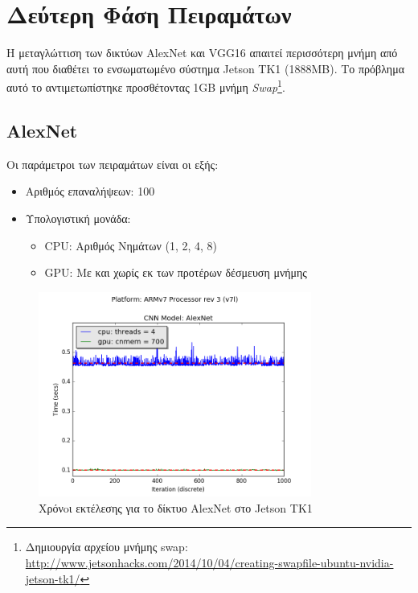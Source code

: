 \section{Δεύτερη Φάση Πειραμάτων}
\label{sec:experiments_phase2}

Η μεταγλώττιση των δικτύων AlexNet και VGG16 απαιτεί περισσότερη
μνήμη από αυτή που διαθέτει το ενσωματωμένο σύστημα Jetson TK1 (1888MB).
Το πρόβλημα αυτό το αντιμετωπίστηκε προσθέτοντας 1GB μνήμη
\emph{Swap}\footnote{Δημιουργία αρχείου μνήμης swap: \url{http://www.jetsonhacks.com/2014/10/04/creating-swapfile-ubuntu-nvidia-jetson-tk1/}}.


\subsection{AlexNet}

Οι παράμετροι των πειραμάτων είναι οι εξής:
\begin{itemize}
  \item{Αριθμός επαναλήψεων: 100}
  \item{Υπολογιστική μονάδα:}
    \begin{itemize}
      \item{CPU: Αριθμός Νημάτων (1, 2, 4, 8)}
      \item{GPU: Με και χωρίς εκ των προτέρων δέσμευση μνήμης}
    \end{itemize}
\end{itemize}

\begin{figure}[H]
  \centering
  \includegraphics[width=0.8\textwidth]{./images/chapter6/benchmark_alexnet_jetson.png}
  \caption[Χρόνoι εκτέλεσης για το δίκτυο AlexNet στο Jetson TK1]{Χρόνoι εκτέλεσης για το δίκτυο AlexNet στο Jetson TK1}
  \label{fig:alexnet_results_jetson}
\end{figure}

